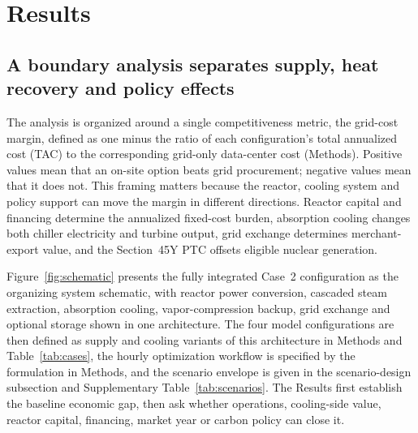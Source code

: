 \documentclass[sn-vancouver,Numbered]{sn-jnl}%
\begin{document}
\section{Results}
\label{sec:results}

\subsection{A boundary analysis separates supply, heat recovery and policy effects}
\label{sec:results:design}

The analysis is organized around a single competitiveness metric, the grid-cost margin, defined as one minus the ratio of each configuration's total annualized cost (TAC) to the corresponding grid-only data-center cost (Methods). Positive values mean that an on-site option beats grid procurement; negative values mean that it does not. This framing matters because the reactor, cooling system and policy support can move the margin in different directions. Reactor capital and financing determine the annualized fixed-cost burden, absorption cooling changes both chiller electricity and turbine output, grid exchange determines merchant-export value, and the Section~45Y PTC offsets eligible nuclear generation.

Figure~\ref{fig:schematic} presents the fully integrated Case~2 configuration as the organizing system schematic, with reactor power conversion, cascaded steam extraction, absorption cooling, vapor-compression backup, grid exchange and optional storage shown in one architecture. The four model configurations are then defined as supply and cooling variants of this architecture in Methods and Table~\ref{tab:cases}, the hourly optimization workflow is specified by the formulation in Methods, and the scenario envelope is given in the scenario-design subsection and Supplementary Table~\ref{tab:scenarios}. The Results first establish the baseline economic gap, then ask whether operations, cooling-side value, reactor capital, financing, market year or carbon policy can close it.
\end{document}
